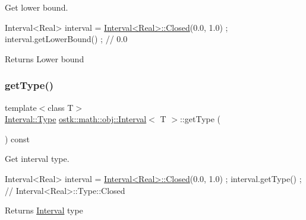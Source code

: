 Get lower bound. 


\begin{DoxyCode}
Interval<Real> interval = \hyperlink{classostk_1_1math_1_1obj_1_1_interval_a48e9f436e8994c49026a1ecd503bc190}{Interval<Real>::Closed}(0.0, 1.0) ;
interval.getLowerBound() ; \textcolor{comment}{// 0.0}
\end{DoxyCode}


\begin{DoxyReturn}{Returns}
Lower bound 
\end{DoxyReturn}
\mbox{\label{classostk_1_1math_1_1obj_1_1_interval_a57317128be5c1e7c4adb798149154d18}} 
\subsubsection{\texorpdfstring{get\+Type()}{getType()}}
{\footnotesize\ttfamily template$<$class T$>$ \\
\hyperlink{classostk_1_1math_1_1obj_1_1_interval_base_a0dd9bd29a9bfefa26de9b88ac81de92a}{Interval\+::\+Type} \hyperlink{classostk_1_1math_1_1obj_1_1_interval}{ostk\+::math\+::obj\+::\+Interval}$<$ T $>$\+::get\+Type (\begin{DoxyParamCaption}{ }\end{DoxyParamCaption}) const}



Get interval type. 


\begin{DoxyCode}
Interval<Real> interval = \hyperlink{classostk_1_1math_1_1obj_1_1_interval_a48e9f436e8994c49026a1ecd503bc190}{Interval<Real>::Closed}(0.0, 1.0) ;
interval.getType() ; \textcolor{comment}{// Interval<Real>::Type::Closed}
\end{DoxyCode}


\begin{DoxyReturn}{Returns}
\hyperlink{classostk_1_1math_1_1obj_1_1_interval}{Interval} type 
\end{DoxyReturn}
\mbox{\label{classostk_1_1math_1_1obj_1_1_interval_a3ce772da90be0c38f8357e1f24850cb5}} 
